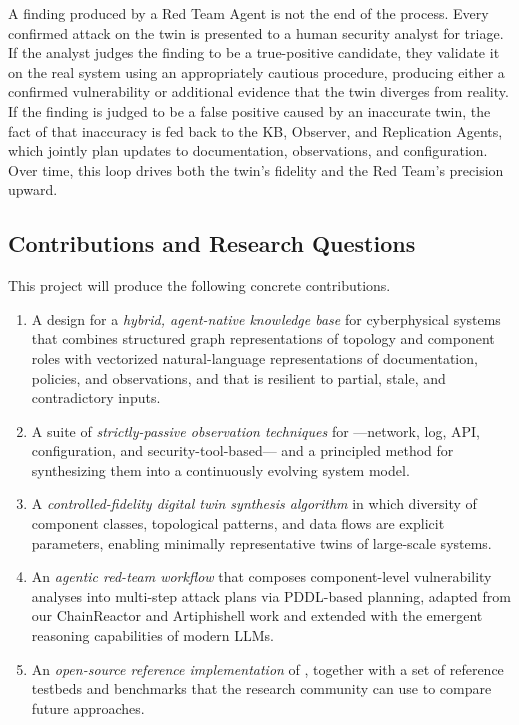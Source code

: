 A finding produced by a Red Team Agent is not the end of the process.
Every confirmed attack on the twin is presented to a human security
analyst for triage. If the analyst judges the finding to be a
true-positive candidate, they validate it on the real system using an
appropriately cautious procedure, producing either a confirmed
vulnerability or additional evidence that the twin diverges from
reality. If the finding is judged to be a false positive caused by an
inaccurate twin, the fact of that inaccuracy is fed back to the KB,
Observer, and Replication Agents, which jointly plan updates to
documentation, observations, and configuration. Over time, this loop
drives both the twin's fidelity and the Red Team's precision upward.

\subsection{Contributions and Research Questions}
\label{sec:intro-contribs}

This project will produce the following concrete contributions.

\begin{enumerate}[leftmargin=1.5em,itemsep=0.15em,topsep=0.3em]
  \item A design for a \emph{hybrid, agent-native knowledge base} for
  cyberphysical systems that combines structured graph representations
  of topology and component roles with vectorized natural-language
  representations of documentation, policies, and observations, and
  that is resilient to partial, stale, and contradictory inputs.

  \item A suite of \emph{strictly-passive observation techniques} for
  \CPSs---network, log, API, configuration, and security-tool-based---
  and a principled method for synthesizing them into a continuously
  evolving system model.

  \item A \emph{controlled-fidelity digital twin synthesis algorithm}
  in which diversity of component classes, topological patterns, and
  data flows are explicit parameters, enabling minimally representative
  twins of large-scale systems.

  \item An \emph{agentic red-team workflow} that composes component-level
  vulnerability analyses into multi-step attack plans via PDDL-based
  planning, adapted from our ChainReactor and Artiphishell work and
  extended with the emergent reasoning capabilities of modern LLMs.

  \item An \emph{open-source reference implementation} of \sysname,
  together with a set of reference \cps testbeds and benchmarks that
  the research community can use to compare future approaches.
\end{enumerate}

